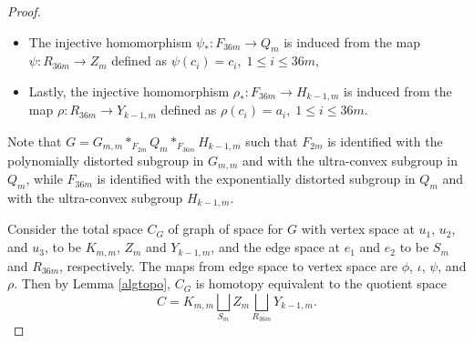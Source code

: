 \documentclass[oneside,11pt,reqno]{amsart}
\theoremstyle{definition}
\begin{document}
\begin{proof}
\begin{itemize}
    \item The injective homomorphism $\psi_\ast:F_{36m} \rightarrow Q_m$ is induced from the map $\psi : R_{36m} \rightarrow Z_{m}$ defined as $\psi (c_i)=c_i, \; 1 \leq i \leq 36m$,
    \item Lastly, the injective homomorphism $\rho_\ast:F_{36m} \rightarrow H_{k-1,m}$ is induced from the map $\rho : R_{36m} \rightarrow Y_{k-1,m}$ defined as $\rho (c_i)=a_i, \; 1 \leq i \leq 36m$.
\end{itemize}

Note that $G=G_{m,m} \ast_{F_{2m}} Q_m \ast_{F_{36m}} H_{k-1,m}$ such that $F_{2m}$ is identified with the polynomially distorted subgroup in $G_{m,m}$ and with the ultra-convex subgroup in $Q_m$, while $F_{36m}$ is identified with the exponentially distorted subgroup in $Q_m$ and with the ultra-convex subgroup $H_{k-1,m}$.


Consider the total space $C_G$ of graph of space for $G$ with vertex space at $u_1$, $u_2$, and $u_3$, to be $K_{m,m}$, $Z_m$ and $Y_{k-1, m}$, and the edge space at $e_1$ and $e_2$ to be $S_m$
and $R_{36m}$, respectively. The maps from edge space to vertex space are $\phi$, $\iota$, $\psi$, and $\rho$. Then by Lemma \ref{algtopo}, $C_G$ is homotopy equivalent to the quotient space
$$C=K_{m,m} \bigsqcup_{S_m} Z_{m} \bigsqcup_{R_{36m}} Y_{k-1,m}.$$









\end{proof}
\end{document}
